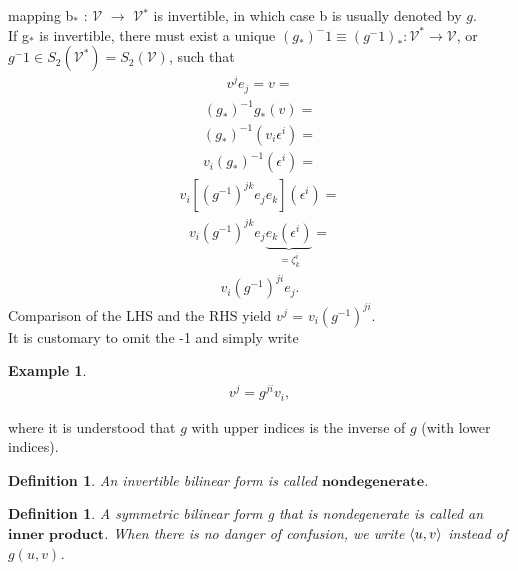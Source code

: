 \documentclass[12pt,a4paper]{article}
\newtheorem{defn}[thm]{Definition}
\newtheorem{exmp}{Example}[section]
\begin{document}
mapping b$_*$ : $\mathcal{V}$ $\to$ $\mathcal{V}$$^*$ is invertible, in which case b is usually denoted by $g$.\\
If g$_*$ is invertible, there must exist a unique $(g_*)^-1 \equiv (g^-1)_* : \mathcal{V}^* \to \mathcal{V}$, or $g^-1 \in S_2(\mathcal{V}^*)= S_2(\mathcal{V})$, such that
\begin{align*}
v^j e_j = v = 
\end{align*}
\begin{align*}
(g_*)^{-1} g_*(v)=
\end{align*}
\begin{align*}
(g_*)^{-1} (v_i \epsilon^i)=
\end{align*}
\begin{align*}
v_i (g_*)^{-1}(\epsilon^i)=
\end{align*}
\begin{align*}
v_i [ (g^{-1})^{jk} e_j e_k ]( \epsilon^i)=
\end{align*}
\begin{align*}
v_i (g^{-1}) ^ {jk} e_j \underbrace{e_k (\epsilon^i)}_{= \zeta^i_k}=
\end{align*}
\begin{align*}
v_i (g^{-1})^{ji} e_j.
\end{align*}
\indent Comparison of the LHS and the RHS yield $v^j$ = $v_i(g^{-1})^{ji}$. \\It is customary
to omit the -1 and simply write \\
\begin{exmp}\label{eq2}
\begin{align*} 
v^j = g ^ {ji} v_{i},
\end{align*}
\end{exmp}
where it is understood that $g$ with upper indices is the inverse of $g$ (with
lower indices). \\
\begin{defn}
An invertible bilinear form is called $\textbf{nondegenerate}$.
\end{defn}
\begin{defn}
A symmetric bilinear form g that is nondegenerate is called an $\textbf{inner product}$. When there is no danger of confusion, we write $\braket{u, v}$ instead of $g(u, v)$.
\end{defn}
\end{document}
